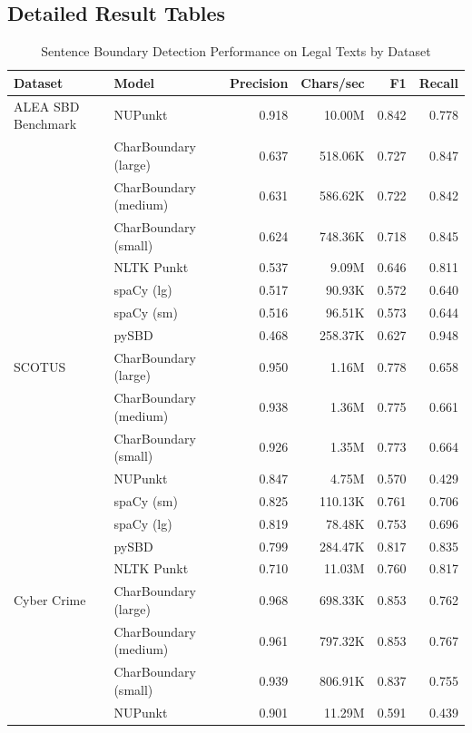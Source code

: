 \appendix
 
\subsection{Detailed Result Tables}\label{appendix:DetailedResults}

\begin{table}[h!]
\centering
\caption{Sentence Boundary Detection Performance on Legal Texts by Dataset}
\label{tab:sbd-precision-performance}
\begin{tabular}{llrrrr}
\toprule
Dataset & Model & \textbf{Precision} & Chars/sec & F1 & Recall \\
\midrule
ALEA SBD Benchmark & NUPunkt & 0.918 & 10.00M & 0.842 & 0.778 \\
 & CharBoundary (large) & 0.637 & 518.06K & 0.727 & 0.847 \\
 & CharBoundary (medium) & 0.631 & 586.62K & 0.722 & 0.842 \\
 & CharBoundary (small) & 0.624 & 748.36K & 0.718 & 0.845 \\
 & NLTK Punkt & 0.537 & 9.09M & 0.646 & 0.811 \\
 & spaCy (lg) & 0.517 & 90.93K & 0.572 & 0.640 \\
 & spaCy (sm) & 0.516 & 96.51K & 0.573 & 0.644 \\
 & pySBD & 0.468 & 258.37K & 0.627 & 0.948 \\
\midrule
SCOTUS & CharBoundary (large) & 0.950 & 1.16M & 0.778 & 0.658 \\
 & CharBoundary (medium) & 0.938 & 1.36M & 0.775 & 0.661 \\
 & CharBoundary (small) & 0.926 & 1.35M & 0.773 & 0.664 \\
 & NUPunkt & 0.847 & 4.75M & 0.570 & 0.429 \\
 & spaCy (sm) & 0.825 & 110.13K & 0.761 & 0.706 \\
 & spaCy (lg) & 0.819 & 78.48K & 0.753 & 0.696 \\
 & pySBD & 0.799 & 284.47K & 0.817 & 0.835 \\
 & NLTK Punkt & 0.710 & 11.03M & 0.760 & 0.817 \\
\midrule
Cyber Crime & CharBoundary (large) & 0.968 & 698.33K & 0.853 & 0.762 \\
 & CharBoundary (medium) & 0.961 & 797.32K & 0.853 & 0.767 \\
 & CharBoundary (small) & 0.939 & 806.91K & 0.837 & 0.755 \\
 & NUPunkt & 0.901 & 11.29M & 0.591 & 0.439 \\

\end{tabular}
\end{table}
